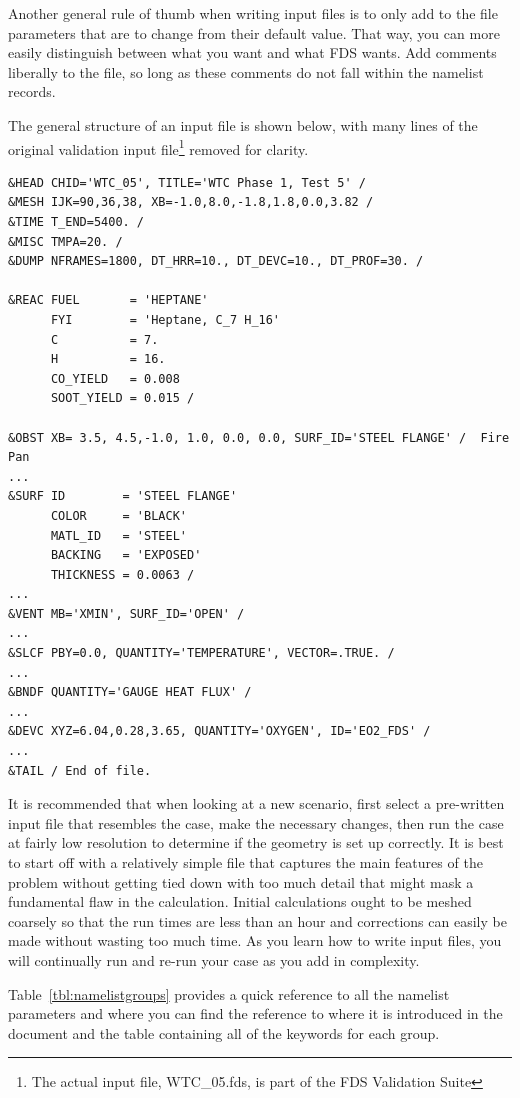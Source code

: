 \documentclass[11pt]{book}
\begin{document}
Another general rule of thumb when writing input files is to only add to the file parameters that are to change from their
default value. That way, you can more easily distinguish between what you want and what FDS wants.
Add comments liberally to the file, so long as
these comments do not fall within the namelist records.

The general structure of an input file is shown below, with many
lines of the original validation input file\footnote{The actual input file, WTC\_05.fds, is part of the FDS
Validation Suite} removed for clarity.

\footnotesize
\begin{verbatim}
&HEAD CHID='WTC_05', TITLE='WTC Phase 1, Test 5' /
&MESH IJK=90,36,38, XB=-1.0,8.0,-1.8,1.8,0.0,3.82 /
&TIME T_END=5400. /
&MISC TMPA=20. /
&DUMP NFRAMES=1800, DT_HRR=10., DT_DEVC=10., DT_PROF=30. /

&REAC FUEL       = 'HEPTANE'
      FYI        = 'Heptane, C_7 H_16'
      C          = 7.
      H          = 16.
      CO_YIELD   = 0.008
      SOOT_YIELD = 0.015 /

&OBST XB= 3.5, 4.5,-1.0, 1.0, 0.0, 0.0, SURF_ID='STEEL FLANGE' /  Fire Pan
...
&SURF ID        = 'STEEL FLANGE'
      COLOR     = 'BLACK'
      MATL_ID   = 'STEEL'
      BACKING   = 'EXPOSED'
      THICKNESS = 0.0063 /
...
&VENT MB='XMIN', SURF_ID='OPEN' /
...
&SLCF PBY=0.0, QUANTITY='TEMPERATURE', VECTOR=.TRUE. /
...
&BNDF QUANTITY='GAUGE HEAT FLUX' /
...
&DEVC XYZ=6.04,0.28,3.65, QUANTITY='OXYGEN', ID='EO2_FDS' /
...
&TAIL / End of file.
\end{verbatim}
\normalsize

\noindent
It is recommended that when looking at a new scenario,
first select a pre-written input file that resembles the case,
make the necessary changes, then run the case at fairly low
resolution to determine if the geometry is set up correctly.
It is best to start off with a relatively simple file that captures the main
features of the problem without getting tied down with too much detail that
might mask a fundamental flaw in the calculation. Initial calculations ought
to be meshed coarsely so that the run times are less than an hour and
corrections can easily be made without wasting too much time.
As you learn how to write input files, you will continually
run and re-run your case as you add in complexity.

Table~\ref{tbl:namelistgroups} provides a quick reference to all the namelist parameters and
where you can find the reference to where it is introduced in the document and the
table containing all of the keywords for each group.
\end{document}
